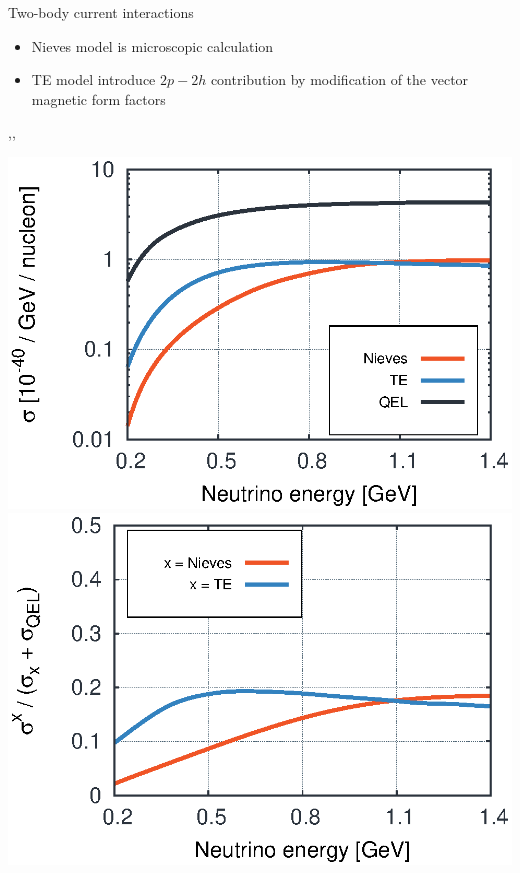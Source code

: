 \begin{wideslide}[toc=]{Two-body current interactions}
\null\vfill

  \begin{itemize}
    \item Nieves model is microscopic calculation
    \item TE model introduce $2p-2h$ contribution by modification of the vector magnetic form factors
  \end{itemize}
  
  \sep\sep

  \twocolumn
  {
    \includegraphics[width=\columnwidth]{img/mec_xsec.eps}
  }
  {
    \includegraphics[width=\columnwidth]{img/mec_ratio.eps}  
  }


\vfill\null
\end{wideslide}

